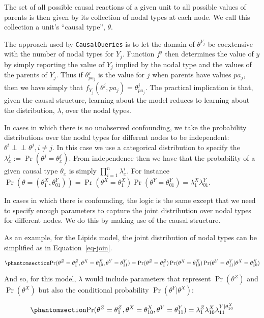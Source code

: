 \documentclass[
  11pt,
  article]{jss}
\begin{document}
The set of all possible causal reactions of a given unit to all possible
values of parents is then given by its collection of nodal types at each
node. We call this collection a unit's ``causal type'', \(\theta\).

The approach used by \texttt{CausalQueries} is to let the domain of
\(\theta^{Y_j}\) be coextensive with the number of nodal types for
\(Y_j\). Function \(f^j\) then determines the value of \(y\) by simply
reporting the value of \(Y_j\) implied by the nodal type and the values
of the parents of \(Y_j\). Thus if \(\theta^j_{pa_j}\) is the value for
\(j\) when parents have values \(pa_j\), then we have simply that
\(f_{Y_j}(\theta^{j}, pa_j) = \theta^j_{pa_j}\). The practical
implication is that, given the causal structure, learning about the
model reduces to learning about the distribution, \(\lambda\), over the
nodal types.

In cases in which there is no unobserved confounding, we take the
probability distributions over the nodal types for different nodes to be
independent: \(\theta^i \perp\!\!\! \perp \theta^j, i\neq j\). In this
case we use a categorical distribution to specify the
\({\lambda^j_x} := \Pr(\theta^j = {\theta^j_x})\). From independence
then we have that the probability of a given causal type \(\theta_x\) is
simply \(\prod_{i=1}^n {\lambda^i_x}\). For instance
\(\Pr(\theta = (\theta^X_1, \theta^Y_{01})) = \Pr(\theta^X = \theta^X_1)\Pr(\theta^Y = \theta^Y_{01}) = \lambda^X_1\lambda^Y_{01}\).

In cases in which there is confounding, the logic is the same except
that we need to specify enough parameters to capture the joint
distribution over nodal types for different nodes. We do this by making
use of the causal structure.

As an example, for the Lipids model, the joint distribution of nodal
types can be simplified as in Equation~\ref{eq-join}.

\begin{equation}\phantomsection\label{eq-join}{
\Pr(\theta^Z = \theta^Z_1, \theta^X = \theta^X_{10}, \theta^Y = \theta^Y_{11}) = 
\Pr(\theta^Z = \theta^Z_1)\Pr(\theta^X = \theta^X_{10})\Pr(\theta^Y = \theta^Y_{11}|\theta^X = \theta^X_{10})
}\end{equation}

And so, for this model, \(\lambda\) would include parameters that
represent \(\Pr(\theta^Z)\) and \(\Pr(\theta^X)\) but also the
conditional probability \(\Pr(\theta^Y|\theta^X)\):

\begin{equation}\phantomsection\label{eq-join2}{
\Pr(\theta^Z = \theta^Z_1, \theta^X = \theta^X_{10}, \theta^Y = \theta^Y_{11}) = 
\lambda^Z_1\lambda^X_{10}\lambda^{Y|\theta^X_{10}}_{11}
}\end{equation}
\end{document}
